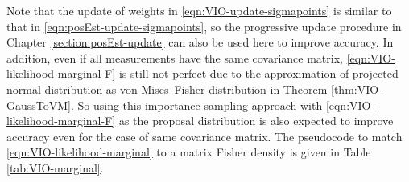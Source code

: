 Note that the update of weights in \eqref{eqn:VIO-update-sigmapoints} is similar to that in \eqref{eqn:posEst-update-sigmapoints}, so the progressive update procedure in Chapter \ref{section:posEst-update} can also be used here to improve accuracy.
In addition, even if all measurements have the same covariance matrix, \eqref{eqn:VIO-likelihood-marginal-F} is still not perfect due to the approximation of projected normal distribution as von Mises--Fisher distribution in Theorem \ref{thm:VIO-GaussToVM}.
So using this importance sampling approach with \eqref{eqn:VIO-likelihood-marginal-F} as the proposal distribution is also expected to improve accuracy even for the case of same covariance matrix.
The pseudocode to match \eqref{eqn:VIO-likelihood-marginal} to a matrix Fisher density is given in Table \ref{tab:VIO-marginal}.


